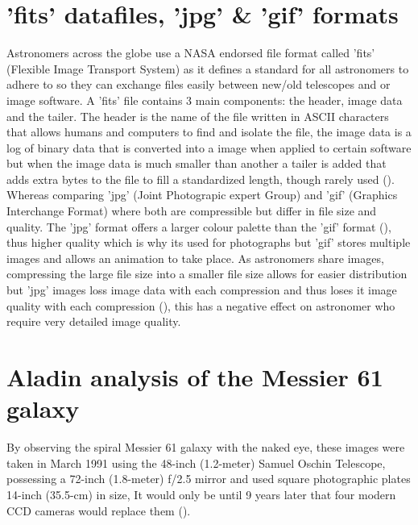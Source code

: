 \documentclass[12pt]{article}
\begin{document}
\section{'fits' datafiles, 'jpg' \& 'gif' formats}
\label{Section 1}

Astronomers across the globe use a NASA endorsed file format called ’fits’ (Flexible Image Transport System) as it defines a standard for all astronomers to adhere to so they can exchange files easily between new/old telescopes and or image software. A 'fits' file contains 3 main components: the header, image data and the tailer. The header is the name of the file written in ASCII characters that allows humans and computers to find and isolate the file, the image data is a log of binary data that is converted into a image when applied to certain software but when the image data is much smaller than another a tailer is added that adds extra bytes to the file to fill a standardized length, though rarely used (\cite{ImageProcessing}). \\

Whereas comparing 'jpg' (Joint Photograpic expert Group) and 'gif' (Graphics Interchange Format) where both are compressible but differ in file size and quality. The 'jpg' format offers a larger colour palette than the 'gif' format (\cite{Jpgvsgif1}), thus higher quality which is why its used for photographs but 'gif' stores multiple images and allows an animation to take place. As astronomers share images, compressing the large file size into a smaller file size allows for easier distribution but 'jpg' images loss image data with each compression and thus loses it image quality with each compression (\cite{Jpgvsgif2}), this has a negative effect on astronomer who require very detailed image quality. \\

\section{Aladin analysis of the Messier 61 galaxy}
\label{Section 2}

By observing the spiral Messier 61 galaxy with the naked eye, these images were taken in March 1991 using the 48-inch (1.2-meter) Samuel Oschin Telescope, possessing a 72-inch (1.8-meter) f/2.5 mirror and used square photographic plates 14-inch (35.5-cm) in size, It would only be until 9 years later that four modern CCD cameras would replace them (\cite{Telescope}). \\
\end{document}
